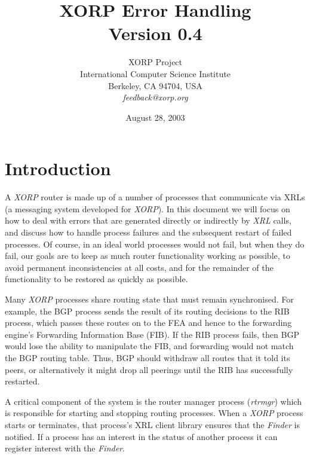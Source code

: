 \documentclass[11pt]{article}
\makeatletter
\newcommand{\xorp} {{\em XORP}\@\xspace}
\newcommand{\finder} {{\em Finder}\@\xspace}
\newcommand{\xrl} {{\em XRL}\@\xspace}
\newcommand{\rtrmgr} {{\em rtrmgr}\@\xspace}
\makeatother
\begin{document}
\title{XORP Error Handling \\
\vspace{1ex}
Version 0.4}
\author{ XORP Project					\\
	 International Computer Science Institute	\\
	 Berkeley, CA 94704, USA			\\
	 {\it feedback@xorp.org}
}
\date{August 28, 2003}

\maketitle

\thispagestyle{empty}


\section{Introduction}

A \xorp router is made up of a number of processes that communicate
via XRLs \cite{xorp:xrl} (a messaging system developed for \xorp). In
this document we will focus on how to deal with errors that are
generated directly or indirectly by \xrl calls, and discuss how to
handle process failures and the subsequent restart of failed
processes.  Of course, in an ideal world processes would not fail, but
when they do fail, our goals are to keep as much router
functionality working as possible, to avoid permanent inconsistencies
at all costs, and for the remainder of the functionality to be
restored as quickly as possible.

Many \xorp processes share routing state that must remain
synchronised. For example, the BGP process sends the result of its
routing decisions to the RIB process, which passes these routes on to
the FEA and hence to the forwarding engine's Forwarding Information
Base (FIB). If the RIB process fails, then BGP would lose the ability
to manipulate the FIB, and forwarding would not match the BGP routing
table.  Thus, BGP should withdraw all routes that it told its peers, or
alternatively it might drop all peerings until the RIB has
successfully restarted.

A critical component of the system is the router manager process
(\rtrmgr) which is responsible for starting and stopping routing
processes. When a \xorp process starts or terminates, that
process's XRL client library ensures that the \finder is notified. If
a process has an interest in the status of another process it can
register interest with the \finder.
\end{document}

